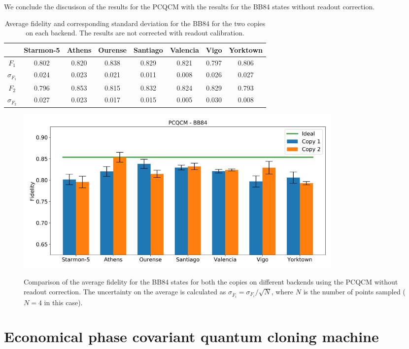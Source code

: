 We conclude the discusison of the results for the PCQCM with the results for the BB84 states without readout correction.
\begin{table}[H]
    \centering
    \begin{tabular}{|c|c|c|c|c|c|c|c|}
    \hline
    \textbf{} & \textbf{Starmon-5} & \textbf{Athens} & \textbf{Ourense} & \textbf{Santiago} & \textbf{Valencia} & \textbf{Vigo} & \textbf{Yorktown} \\ \hline
    $F_1$              & 0.802 & 0.820 & 0.838 & 0.829 & 0.821 & 0.797 & 0.806 \\ \hline
    $\sigma_{F_1}$     & 0.024 & 0.023 & 0.021 & 0.011 & 0.008 & 0.026 & 0.027 \\ \hline
    $F_2$              & 0.796 & 0.853 & 0.815 & 0.832 & 0.824 & 0.829 & 0.793 \\ \hline
    $\sigma_{F_2}$     & 0.027 & 0.023 & 0.017 & 0.015 & 0.005 & 0.030 & 0.008 \\ \hline
    \end{tabular}
    \caption{Average fidelity and corresponding standard deviation for the BB84 for the two copies on each backend. The results are not corrected with readout calibration.}
    \label{tab:results_pcqcm_bb84_not_corrected}
\end{table}
\begin{figure}[H]
  \centering
          \includegraphics[width=0.8\textwidth]{Figures/PhaseCovariant/Histograms/histo_bb84.png}
      \label{fig:pc_histo_bb84_corrected}
      \caption{Comparison of the average fidelity for the BB84 states for both the copies on different backends using the PCQCM without readout correction. The uncertainty on the average is calculated as $\sigma_{\overline{F}_i}=\sigma_{F_i}/\sqrt{N}$, where $N$ is the number of points sampled ($N=4$ in this case).}
\end{figure}

\section{Economical phase covariant quantum cloning machine}
